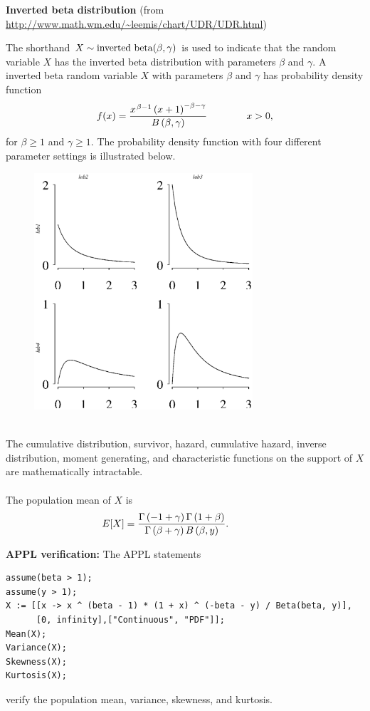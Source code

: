 \documentclass[12pt,fullpage]{article}
\begin{document}
\noindent
{\bf Inverted beta distribution} (from \color{blue}\url{http://www.math.wm.edu/~leemis/chart/UDR/UDR.html}\color{black})

\noindent
The shorthand $X \sim {\rm inverted\  beta}(\beta, \gamma)$ is used to indicate that the
random variable $X$ has the inverted beta distribution with parameters $\beta$ and $\gamma$.
A inverted beta random variable $X$ with parameters $\beta$ and $\gamma$ has probability density function 
$$
f(x) = {\frac {{x} ^ {{\it \kern 0.08 em \beta} - 1} \left( x + 1 \right) ^ {- {\it \beta}
 - \gamma}}{B  \left( {\it \beta},\gamma \right) }} \qquad \qquad x > 0,
$$
for $\beta \ge 1$ and $\gamma \ge 1$. 
The probability density function with four different parameter settings is illustrated below.
{\begin{figure}[h!]
\begin{center}
\includegraphics[width=3.2in]{InvertedbetaPlot.ps}
\end{center}
\end{figure}}\\
The cumulative distribution, survivor, hazard, cumulative hazard, 
inverse distribution, moment generating, and characteristic functions on the support of $X$ are mathematically intractable.\\ \\
The population mean of $X$ is
$$
E[X] = {\frac {\Gamma  \left( -1+\gamma \right) \Gamma  \left( 1+{\it \beta}
 \right) }{\Gamma  \left( {\it \beta}+\gamma \right) B \left( {\it \beta
},y \right) }}. \qquad \qquad 
$$


\vspace{0.1in}

\newpage
\noindent
{\bf APPL verification:}
The APPL statements
\begin{verbatim}
assume(beta > 1);
assume(y > 1);
X := [[x -> x ^ (beta - 1) * (1 + x) ^ (-beta - y) / Beta(beta, y)],
      [0, infinity],["Continuous", "PDF"]];
Mean(X);
Variance(X);
Skewness(X);
Kurtosis(X);
\end{verbatim}
verify the population mean, variance, skewness, and kurtosis.
\end{document}
